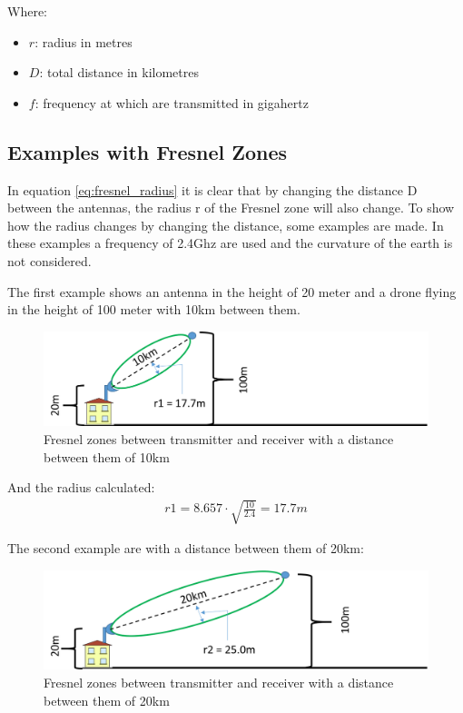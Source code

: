 Where:
\begin{itemize}[label=]
    \item $r$: radius in metres
    \item $D$: total distance in kilometres
    \item $f$: frequency at which are transmitted in gigahertz
\end{itemize}

\subsection{Examples with Fresnel Zones}
In equation \ref{eq:fresnel_radius} it is clear that by changing the distance D between the antennas, the radius r of the Fresnel zone will also change. To show how the radius changes by changing the distance, some examples are made. In these examples a frequency of 2.4Ghz are used and the curvature of the earth is not considered.

The first example shows an antenna in the height of 20 meter and a drone flying in the height of 100 meter with 10km between them.

\begin{figure}[H]
	\centering
	\includegraphics[scale=0.50]{figures/fresnel_10km.png}
	\caption{Fresnel zones between transmitter and receiver with a distance between them of 10km}
	\label{fig:fresnel_zones_10km}
\end{figure}  

\noindent And the radius calculated:
\begin{align*}
r1 = 8.657\cdot \sqrt{\frac{10}{2.4}} = 17.7m
\end{align*}

\noindent The second example are with a distance between them of 20km:

\begin{figure}[H]
	\centering
	\includegraphics[scale=0.50]{figures/fresnel_20km.png}
	\caption{Fresnel zones between transmitter and receiver with a distance between them of 20km}
	\label{fig:fresnel_zones_20km}
\end{figure}  

